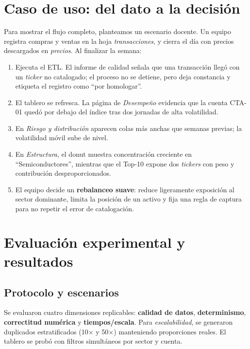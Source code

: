 \documentclass[conference]{IEEEtran}
\begin{document}
\section{Caso de uso: del dato a la decisión}
Para mostrar el flujo completo, planteamos un escenario docente. Un equipo registra compras y ventas en la hoja \emph{transacciones}, y cierra el día con precios descargados en \emph{precios}. Al finalizar la semana:
\begin{enumerate}
  \item Ejecuta el ETL. El informe de calidad señala que una transacción llegó con un \emph{ticker} no catalogado; el proceso no se detiene, pero deja constancia y etiqueta el registro como “por homologar”.
  \item El tablero se refresca. La página de \emph{Desempeño} evidencia que la cuenta CTA-01 quedó por debajo del índice tras dos jornadas de alta volatilidad.
  \item En \emph{Riesgo y distribución} aparecen colas más anchas que semanas previas; la volatilidad móvil sube de nivel.
  \item En \emph{Estructura}, el donut muestra concentración creciente en “Semiconductores”, mientras que el Top-10 expone dos \emph{tickers} con peso y contribución desproporcionados.
  \item El equipo decide un \textbf{rebalanceo suave}: reduce ligeramente exposición al sector dominante, limita la posición de un activo y fija una regla de captura para no repetir el error de catalogación.
\end{enumerate}

\section{Evaluación experimental y resultados}
\subsection{Protocolo y escenarios}
Se evaluaron cuatro dimensiones replicables: \textbf{calidad de datos}, \textbf{determinismo}, \textbf{correctitud numérica} y \textbf{tiempos/escala}. Para \emph{escalabilidad}, se generaron duplicados estratificados (10$\times$ y 50$\times$) manteniendo proporciones reales. El tablero se probó con filtros simultáneos por sector y cuenta.
\end{document}
